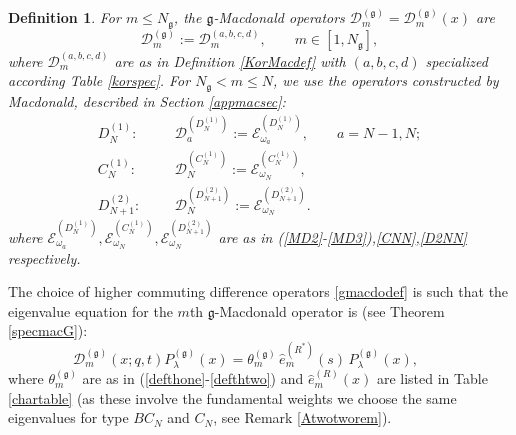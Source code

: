 \documentclass[12pt]{amsart}
\newtheorem{defn}[thm]{Definition}
\newcommand{\g}{{\mathfrak{g}}}
\numberwithin{equation}{section}
\begin{document}
\begin{defn}\label{gmacdodef} For $m\leq N_\g$,
the $\g$-Macdonald operators ${\mathcal D}_m^{(\g)}= {\mathcal D}_m^{(\g)}(x)$ are
$${\mathcal D}_m^{(\g)}:= {\mathcal D}_m^{(a,b,c,d)}, \qquad m\in[1,N_\g], $$
where $ {\mathcal D}_m^{(a,b,c,d)}$ are as in Definition \ref{KorMacdef} with
$(a,b,c,d)$ specialized according Table \ref{korspec}. For $N_\g<m\leq N$, we use the operators constructed by Macdonald,
described in Section \ref{appmacsec}:
\begin{eqnarray}
D_N^{(1)}:\quad &&
{\mathcal D}_a^{(D_N^{(1)})}:={\mathcal E}_{\omega_a}^{(D_N^{(1)})},\qquad a=N-1,N\label{dplus};\\
C_N^{(1)}:\quad && {\mathcal D}_N^{(C_N^{(1)})}:={\mathcal E}_{\omega_N}^{(C_N^{(1)})}, \label{cplus}\\
D_{N+1}^{(2)}:&&
{\mathcal D}_N^{(D^{(2)}_{N+1})}:={\mathcal E}_{\omega_N}^{(D^{(2)}_{N+1})} \label{dtwoplus}.
\end{eqnarray}
where ${\mathcal E}_{\omega_a}^{(D_N^{(1)})},{\mathcal E}_{\omega_N}^{(C_N^{(1)})},{\mathcal E}_{\omega_N}^{(D^{(2)}_{N+1})}$ are as in (\ref{MD2}-\ref{MD3}),\eqref{CNN},\eqref{D2NN} respectively.
\end{defn}

The choice of higher commuting difference operators \eqref{gmacdodef} is such that the eigenvalue equation for the $m$th $\g$-Macdonald operator is (see Theorem \ref{specmacG}):
\begin{equation}\label{macdo}
{\mathcal D}_m^{(\g)}(x;q,t) P_\lambda^{(\g)}(x)=\theta_m^{(\g)}\, {\hat e}_m^{(R^*)}(s) \, P_\lambda^{(\g)}(x), \qquad 
\end{equation}
where $\theta_m^{(\g)}$ are as in (\ref{defthone}-\ref{defthtwo}) and ${\hat e}_m^{(R)}(x)$ are listed in Table \ref{chartable} (as these involve the 
fundamental weights we choose the same eigenvalues for type $BC_N$ and $C_N$, see Remark \ref{Atwotworem}).
\end{document}
